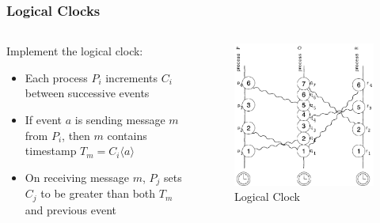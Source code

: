 \documentclass{beamer}
\begin{document}
\frame
{
	\frametitle{Logical Clocks}

	\begin{columns}
	\begin{column}{0.6\textwidth}

		Implement the logical clock:

		\begin{itemize}
			\item<2-> Each process $P_i$ increments $C_i$ between successive events
			\item<3-> If event $a$ is sending message $m$ from $P_i$, then $m$ contains timestamp $T_m=C_i\langle a\rangle$
			\item<4-> On receiving message $m$, $P_j$ sets $C_j$ to be greater than both $T_m$ and previous event
		\end{itemize}


	\end{column}
	\begin{column}{0.4\textwidth}

		\begin{figure}[ht!]
		\includegraphics[width=\textwidth]{files/ClockDist-Logical-Clock.png}
		\caption{Logical Clock}
		\end{figure}


	\end{column}
	\end{columns}


}
\end{document}

